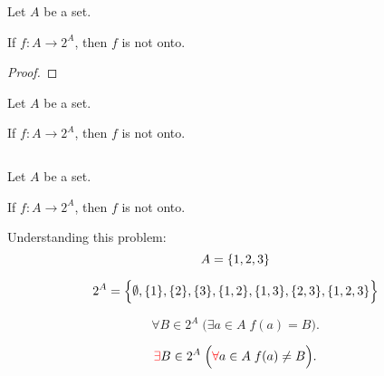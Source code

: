 \begin{frame}{}
  \begin{theorem}
    Let $A$ be a set. 

    If $f: A \to 2^{A}$, then $f$ is not onto.
  \end{theorem}

  \begin{proof}
  \end{proof}
\end{frame}

\begin{frame}{}
  \begin{theorem}
    Let $A$ be a set. 

    If $f: A \to 2^{A}$, then $f$ is not onto.
  \end{theorem}

  \vspace{0.60cm}
  \begin{columns}
    \pause
    \pause
    \pause
    \pause
  \end{columns}
\end{frame}

\begin{frame}{}
  \begin{theorem}
    Let $A$ be a set. 

    If $f: A \to 2^{A}$, then $f$ is not onto.
  \end{theorem}

  \vspace{0.30cm}
  Understanding this problem:
  \[
    A = \{1,2,3\}
  \]

  \begin{description}
    \pause
    \item[$2^{A}$]
      \[
	2^{A} = \Big\{\emptyset, \{1\}, \{2\}, \{3\}, \{1,2\}, \{1,3\}, \{2,3\}, \{1,2,3\}\Big\}
      \]
    \pause
    \item[Onto]
      \[
	\forall B \in 2^{A}\; \Big(\exists a \in A\; f(a) = B\Big).
      \]
    \pause
    \item[Not Onto]
      \[
	\textcolor{red}{\exists} B \in 2^{A}\; \Big(\textcolor{red}{\forall} a \in A\; f(a) \neq B\Big).
      \]
  \end{description}
\end{frame}

